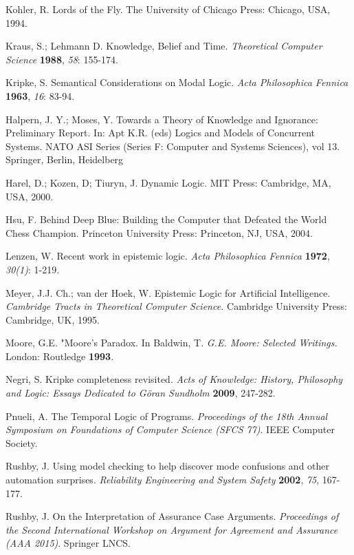 \begin{thebibliography}{9}
	 	Kohler, R. Lords of the Fly. The University of Chicago Press: Chicago, USA, 1994.
	 	
	 	Kraus, S.; Lehmann D. Knowledge, Belief and Time. {\em Theoretical Computer Science} {\bf 1988}, {\em 58}: 155-174.
	 	
	 	Kripke, S. Semantical Considerations on Modal Logic. {\em Acta Philosophica Fennica} {\bf 1963}, {\em 16}: 83-94.
	 	
	 	Halpern, J. Y.; Moses, Y.  Towards a Theory of Knowledge and Ignorance: Preliminary Report. In: Apt K.R. (eds) Logics and Models of Concurrent Systems. NATO ASI Series (Series F: Computer and Systems Sciences), vol 13. Springer, Berlin, Heidelberg
	 	
	 	Harel, D.; Kozen, D; Tiuryn, J. Dynamic Logic. MIT Press: Cambridge, MA, USA, 2000.
	 	
	 	Hsu, F. Behind Deep Blue: Building the Computer that Defeated the World Chess Champion. Princeton University Press: Princeton, NJ, USA, 2004.
	 	
	 	Lenzen, W. Recent work in epistemic logic. {\em Acta Philosophica Fennica} {\bf 1972}, {\em 30(1)}: 1-219.
	 	
	 	Meyer, J.J. Ch.; van der Hoek, W. Epistemic Logic for Artificial Intelligence. {\em Cambridge Tracts in Theoretical Computer Science.} Cambridge University Press: Cambridge, UK, 1995.
	 	
	 	Moore, G.E. "Moore's Paradox. In Baldwin, T. {\em G.E. Moore: Selected Writings.} London: Routledge {\bf 1993}.
	 	
	 	Negri, S. Kripke completeness revisited. {\em Acts of Knowledge: History, Philosophy and Logic: Essays Dedicated to G{\"o}ran Sundholm} {\bf 2009}, 247-282.
	 	
	 	Pnueli, A.  The Temporal Logic of Programs. {\em Proceedings of the 18th Annual Symposium on Foundations of Computer Science (SFCS 77)}. IEEE Computer Society.
	 	
	 	Rushby, J. Using model checking to help discover mode confusions and other automation surprises. {\em Reliability Engineering and System Safety} {\bf 2002}, {\em 75}, 167-177.
	 	
	 	Rushby, J. On the Interpretation of Assurance Case Arguments. {\em Proceedings of the Second International Workshop on Argument for Agreement and Assurance (AAA 2015)}. Springer LNCS.
	 	

\end{thebibliography}

